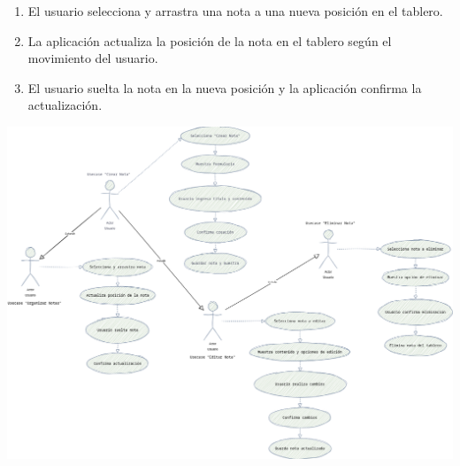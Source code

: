 \begin{enumerate}
  \item El usuario selecciona y arrastra una nota a una nueva posición en el tablero.
  \item La aplicación actualiza la posición de la nota en el tablero según el movimiento del usuario.
  \item El usuario suelta la nota en la nueva posición y la aplicación confirma la actualización.
\end{enumerate}

\begin{center}
    \includegraphics[scale = .75]{IMA/CasosUso.drawio.png}
\end{center}

